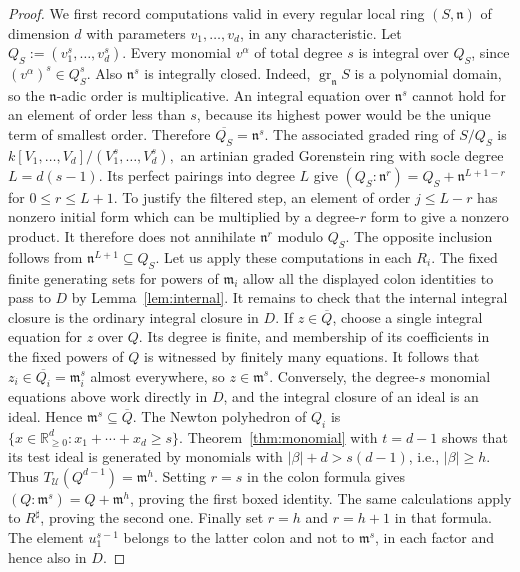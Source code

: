 \documentclass[11pt,a4paper]{amsart}
\numberwithin{equation}{section}
\newcommand{\U}{\mathcal{U}}
\newcommand{\gr}{\operatorname{gr}}
\newcommand{\mm}{\mathfrak m}
\newcommand{\cl}[1]{\overline{#1}}
\begin{document}
 \begin{proof}
 	We first record computations valid in every regular local ring
 	$(S,\mathfrak n)$ of dimension $d$ with parameters
 	$v_1,\ldots,v_d$, in any characteristic. Let
 	$Q_S:=(v_1^s,\ldots,v_d^s)$.
 	Every monomial $v^\alpha$ of total degree $s$ is integral over
 	$Q_S$, since
 $(v^\alpha)^s\in Q_S^s.$
 	Also $\mathfrak n^s$ is integrally closed. Indeed,
 	$\gr_{\mathfrak n}S$ is a polynomial domain, so the
 	$\mathfrak n$-adic order is multiplicative. An integral equation
 	over $\mathfrak n^s$ cannot hold for an element of order less
 	than $s$, because its highest power would be the unique term of
 	smallest order. Therefore
 $\cl{Q_S}=\mathfrak n^s.$
 The associated graded ring of $S/Q_S$ is
$k[V_1,\ldots,V_d]/(V_1^s,\ldots,V_d^s),$
 	an artinian graded Gorenstein ring with socle degree
 	$L=d(s-1)$. Its perfect pairings into degree $L$ give
$(Q_S:\mathfrak n^r)=Q_S+\mathfrak n^{L+1-r}$
 for $0\leq r\leq L+1$.
 	To justify the filtered step, an element of order $j\leq L-r$
 	has nonzero initial form which can be multiplied by a degree-$r$
 	form to give a nonzero product. It therefore does not annihilate
 	$\mathfrak n^r$ modulo $Q_S$. The opposite inclusion follows
 	from $\mathfrak n^{L+1}\subseteq Q_S$.
 Let us apply these computations in each $R_i$. The fixed finite
 	generating sets for powers of $\mm_i$ allow all the displayed
 	colon identities to pass to $D$ by Lemma~\ref{lem:internal}.
 	It remains to check that the internal integral closure is the
 	ordinary integral closure in $D$. If $z\in\cl Q$, choose a
 	single integral equation for $z$ over $Q$. Its degree is finite,
 	and membership of its coefficients in the fixed powers of $Q$
 	is witnessed by finitely many equations. It follows that
 	$z_i\in\cl{Q_i}=\mm_i^s$ almost everywhere, so $z\in\mm^s$.
 	Conversely, the degree-$s$ monomial equations above work directly
 	in $D$, and the integral closure of an ideal is an ideal. Hence
 	$\mm^s\subseteq\cl Q$.
 The Newton polyhedron of $Q_i$ is
 	$\{x\in\mathbb R_{\geq0}^d:x_1+\cdots+x_d\geq s\}.$
 	Theorem~\ref{thm:monomial} with $t=d-1$ shows that its test
 	ideal is generated by monomials with
 	$|\beta|+d>s(d-1)$, i.e., 
 	$|\beta|\geq h.$
 	Thus $T_{\U}(Q^{d-1})=\mm^h$. Setting $r=s$ in the colon
 	formula gives $( Q:\mm^s)=Q+\mm^h$, proving the first boxed
 	identity. The same calculations apply to $R^\sharp$, proving
 	the second one. Finally set $r=h$ and $r=h+1$ in that formula.
 	The element $u_1^{s-1}$ belongs to the latter colon and not to
 	$\mm^s$, in each factor and hence also in $D$.
 \end{proof}
 
\end{document}

